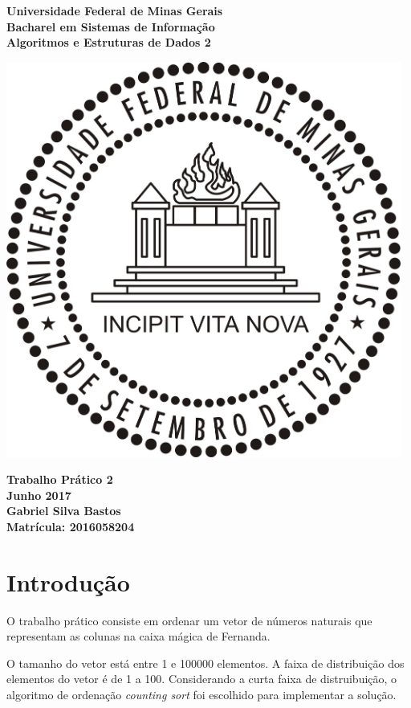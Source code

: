 \documentclass{article}
\begin{document}
\begin{titlepage}
  \centering
  
  \vfill{
    \bfseries\Huge
    Universidade Federal de Minas Gerais\\[5pt]
    \bfseries\Large
    Bacharel em Sistemas de Informação \\
    Algoritmos e Estruturas de Dados 2\\
  }
  
  \vfill
  
  \includegraphics[width=13cm]{images/ufmg_logo.jpg}
  
  \vfill{
    \bfseries\Large
    Trabalho Prático 2\\
    Junho 2017\\
  }
  \vfill{
    \bfseries\large
    Gabriel Silva Bastos\\[5pt]
    Matrícula: 2016058204
  }
\end{titlepage}


\section{Introdução}
O trabalho prático consiste em ordenar um vetor de números naturais que representam as colunas na caixa mágica de Fernanda.

O tamanho do vetor está entre 1 e 100000 elementos. A faixa de distribuição dos elementos do vetor é de 1 a 100. Considerando a curta faixa de distruibuição, o algoritmo de ordenação \textit{counting sort} foi escolhido para implementar a solução.
\end{document}
